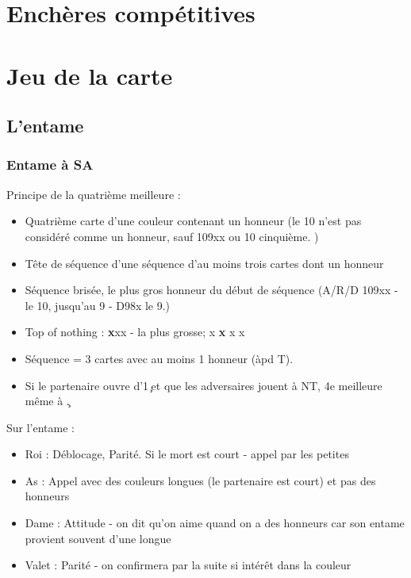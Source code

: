 \documentclass[a4paper]{article}
\begin{document}
\section{Enchères compétitives}

\section{Jeu de la carte}

\subsection{L'entame}

\subsubsection{Entame à SA}

Principe de la quatrième meilleure :

\begin{itemize}
\item Quatrième carte d'une couleur contenant un honneur (le 10 n'est pas considéré comme un honneur, sauf 109xx ou 10 cinquième. )

\item Tête de séquence d'une séquence d'au moins trois cartes dont un honneur

\item Séquence brisée, le plus gros honneur du début de séquence (A/R/D 109xx - le 10, jusqu'au 9 - D98x le 9.)

\item Top of nothing : \textbf{x}xx - la plus grosse; x \textbf{x} x x

\item Séquence = 3 cartes avec au moins 1 honneur (àpd T).

\item Si le partenaire ouvre d'1\c\ et que les adversaires jouent à NT, 4e meilleure même à \c .

\end{itemize}

Sur l'entame :

\begin{itemize}
\item Roi : Déblocage, Parité. Si le mort est court - appel par les petites

\item As : Appel avec des couleurs longues (le partenaire est court) et pas des honneurs

\item Dame : Attitude - on dit qu’on aime quand on a des honneurs car son entame provient souvent d’une longue

\item Valet : Parité - on confirmera par la suite si intérêt dans la couleur

\end{itemize}
\end{document}
